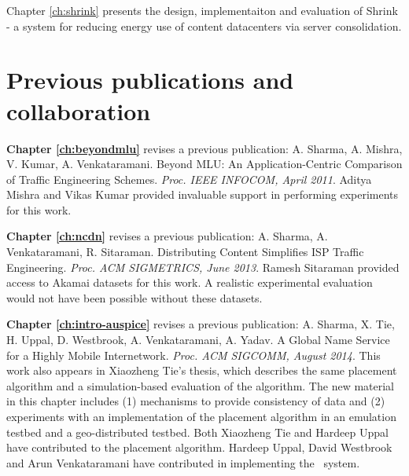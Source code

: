 Chapter \ref{ch:shrink} presents the design, implementaiton and evaluation of Shrink - a system for reducing energy use of content datacenters via server consolidation.

\section{Previous publications and collaboration}

\textbf{Chapter \ref{ch:beyondmlu}} revises a previous publication: A. Sharma, A. Mishra, V. Kumar, A. Venkataramani. Beyond MLU: An Application-Centric Comparison of Traffic Engineering Schemes. \emph{Proc. IEEE INFOCOM, April 2011}. Aditya Mishra and Vikas Kumar provided invaluable support in performing experiments for this work.

\textbf{Chapter \ref{ch:ncdn}} revises a previous publication: A. Sharma, A. Venkataramani, R. Sitaraman. Distributing Content Simplifies ISP Traffic Engineering. \emph{Proc. ACM SIGMETRICS, June 2013}. Ramesh Sitaraman provided access to Akamai datasets for this work. A realistic experimental evaluation would not have been possible without these datasets.

\textbf{Chapter \ref{ch:intro-auspice}} revises a previous publication: A. Sharma, X. Tie, H. Uppal, D. Westbrook, A. Venkataramani, A. Yadav. A Global Name Service for a Highly Mobile Internetwork. \emph{Proc. ACM SIGCOMM, August 2014}. 
This work also appears in Xiaozheng Tie's thesis, which describes the same placement algorithm and a simulation-based evaluation of the algorithm. The new material in this chapter includes (1) mechanisms to provide consistency of data and (2) experiments with an implementation of the placement algorithm in an emulation testbed and a geo-distributed testbed. Both Xiaozheng Tie and Hardeep Uppal have contributed to the placement algorithm. Hardeep Uppal, David Westbrook and Arun Venkataramani have contributed in implementing the \auspice\ system.

